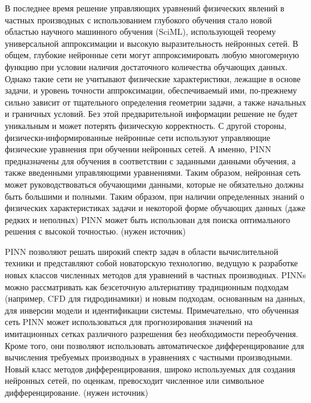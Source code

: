 В последнее время решение управляющих уравнений физических явлений в частных производных с использованием глубокого обучения
стало новой областью научного машинного обучения (SciML), использующей теорему универсальной аппроксимации и высокую
выразительность нейронных сетей. В общем, глубокие нейронные сети могут аппроксимировать любую многомерную функцию
при условии наличия достаточного количества обучающих данных. Однако такие сети не учитывают физические характеристики,
лежащие в основе задачи, и уровень точности аппроксимации, обеспечиваемый ими, по-прежнему сильно зависит от тщательного
определения геометрии задачи, а также начальных и граничных условий. Без этой предварительной информации решение не будет
уникальным и может потерять физическую корректность. С другой стороны, физически-информированные нейронные сети используют
управляющие физические уравнения при обучении нейронных сетей. А именно, PINN предназначены для обучения в соответствии
с заданными данными обучения, а также введенными управляющими уравнениями. Таким образом, нейронная сеть может
руководствоваться обучающими данными, которые не обязательно должны быть большими и полными. Таким образом, при наличии
определенных знаний о физических характеристиках задачи и некоторой форме обучающих данных (даже редких и неполных)
PINN может быть использован для поиска оптимального решения с высокой точностью. (нужен источник)

PINN позволяют решать широкий спектр задач в области вычислительной техники и представляют собой новаторскую технологию,
ведущую к разработке новых классов численных методов для уравнений в частных производных. PINNs можно рассматривать как безсеточную альтернативу
традиционным подходам (например, CFD для гидродинамики) и новым подходам, основанным на данных, для инверсии модели
и идентификации системы. Примечательно, что обученная сеть PINN может использоваться для прогнозирования значений на
имитационных сетках различного разрешения без необходимости переобучения. Кроме того, они позволяют использовать
автоматическое дифференцирование для вычисления требуемых производных в уравнениях с частными производными. Новый класс
методов дифференцирования, широко используемых для создания нейронных сетей, по оценкам, превосходит численное или символьное
дифференцирование. (нужен источник)

